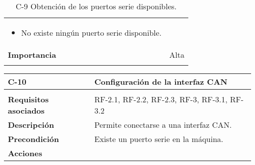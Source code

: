 \begin{longtable}[H]{@{}ll@{}}
\begin{minipage}[t]{0.71\columnwidth}
\begin{itemize}
\item
No existe ningún puerto serie disponible.
\end{itemize}\strut
\end{minipage}\tabularnewline
\begin{minipage}[t]{0.23\columnwidth}\raggedright\strut
\textbf{Importancia}\strut
\end{minipage} & \begin{minipage}[t]{0.71\columnwidth}\raggedright\strut
Alta\strut
\end{minipage}\tabularnewline
\bottomrule
\caption{C-9 Obtención de los puertos serie disponibles.}
\end{longtable}

\begin{longtable}[H]{@{}ll@{}}
\toprule
\begin{minipage}[b]{0.23\columnwidth}\raggedright\strut
\textbf{C-10}\strut
\end{minipage} & \begin{minipage}[b]{0.71\columnwidth}\raggedright\strut
\textbf{Configuración de la interfaz CAN}\strut
\end{minipage}\tabularnewline
\midrule
\endhead
\tabularnewline
\begin{minipage}[t]{0.23\columnwidth}\raggedright\strut
\textbf{Requisitos asociados}\strut
\end{minipage} & \begin{minipage}[t]{0.71\columnwidth}\raggedright\strut
RF-2.1, RF-2.2, RF-2.3, RF-3, RF-3.1, RF-3.2\strut
\end{minipage}\tabularnewline
\begin{minipage}[t]{0.23\columnwidth}\raggedright\strut
\textbf{Descripción}\strut
\end{minipage} & \begin{minipage}[t]{0.71\columnwidth}\raggedright\strut
Permite conectarse a una interfaz CAN.\strut
\end{minipage}\tabularnewline
\begin{minipage}[t]{0.23\columnwidth}\raggedright\strut
\textbf{Precondición}\strut
\end{minipage} & \begin{minipage}[t]{0.71\columnwidth}\raggedright\strut
Existe un puerto serie en la máquina.
\strut
\end{minipage}\tabularnewline
\begin{minipage}[t]{0.23\columnwidth}\raggedright\strut
\textbf{Acciones}\strut

\end{minipage}
\end{longtable}
